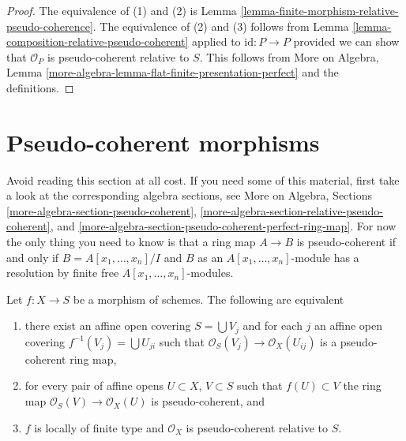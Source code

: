 \begin{proof}
The equivalence of (1) and (2) is
Lemma \ref{lemma-finite-morphism-relative-pseudo-coherence}.
The equivalence of (2) and (3) follows from
Lemma
\ref{lemma-composition-relative-pseudo-coherent}
applied to $\text{id} : P \to P$
provided we can show that $\mathcal{O}_P$ is
pseudo-coherent relative to $S$. This follows from
More on Algebra, Lemma
\ref{more-algebra-lemma-flat-finite-presentation-perfect}
and the definitions.
\end{proof}









\section{Pseudo-coherent morphisms}
\label{section-pseudo-coherent}

\noindent
Avoid reading this section at all cost.
If you need some of this material, first take a look at the
corresponding algebra sections, see
More on Algebra, Sections \ref{more-algebra-section-pseudo-coherent},
\ref{more-algebra-section-relative-pseudo-coherent}, and
\ref{more-algebra-section-pseudo-coherent-perfect-ring-map}.
For now the only thing you need to know is that a ring map
$A \to B$ is pseudo-coherent if and only if $B = A[x_1, \ldots, x_n]/I$
and $B$ as an $A[x_1, \ldots, x_n]$-module has a resolution by
finite free $A[x_1, \ldots, x_n]$-modules.

\begin{lemma}
\label{lemma-pseudo-coherent}
Let $f : X \to S$ be a morphism of schemes. The following are equivalent
\begin{enumerate}
\item there exist an affine open covering $S = \bigcup V_j$ and for each $j$
an affine open covering $f^{-1}(V_j) = \bigcup U_{ji}$ such that
$\mathcal{O}_S(V_j) \to \mathcal{O}_X(U_{ij})$ is a pseudo-coherent
ring map,
\item for every pair of affine opens $U \subset X$, $V \subset S$
such that $f(U) \subset V$ the ring map
$\mathcal{O}_S(V) \to \mathcal{O}_X(U)$ is pseudo-coherent, and
\item $f$ is locally of finite type and $\mathcal{O}_X$
is pseudo-coherent relative to $S$.
\end{enumerate}
\end{lemma}

